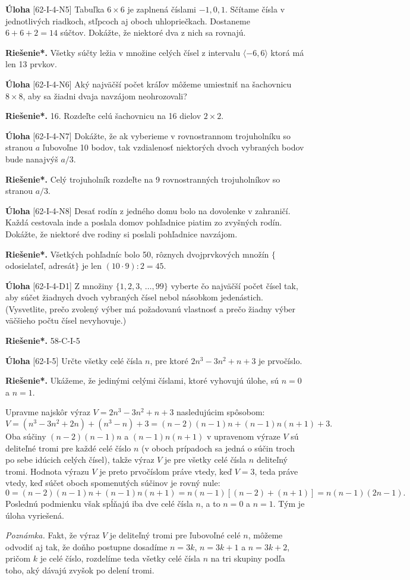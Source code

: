 \documentclass{article}
\newcommand{\rieh}{\textbf{Riešenie*.} }
\newcommand{\problem}[4]{
  \begin{tcolorbox}[breakable,notitle,boxrule=0pt,colback=light-gray,colframe=light-gray]
    \textbf{Úloha}
    [#1] #3
  \end{tcolorbox}
  \noindent#4
}
\begin{document}
\problem{62-I-4-N5}{}{
Tabuľka $6 \times 6$ je zaplnená číslami $-1, 0, 1$. Sčítame čísla v jednotlivých riadkoch, stľpcoch aj oboch uhlopriečkach. Dostaneme $6+6+2 = 14$ súčtov. Dokážte, že niektoré dva z nich sa rovnajú.
}{
\rieh Všetky súčty ležia v množine celých čísel z intervalu $\langle -6, 6 \rangle$ ktorá má len 13 prvkov.
}

\problem{62-I-4-N6}{}{
Aký najväčší počet kráľov môžeme umiestniť na šachovnicu $8\times 8$, aby sa žiadni dvaja navzájom neohrozovali?
}{
\rieh 16. Rozdeľte celú šachovnicu na 16 dielov $2\times 2$.
}


\problem{62-I-4-N7}{}{
Dokážte, že ak vyberieme v rovnostrannom trojuholníku so stranou $a$ ľubovoľne 10 bodov, tak vzdialenosť niektorých dvoch vybraných bodov bude nanajvýš $a/3$.
}{
\rieh Celý trojuholník rozdeľte na 9 rovnostranných trojuholníkov so stranou $a/3$.
}


\problem{62-I-4-N8}{}{
Desať rodín z jedného domu bolo na dovolenke v zahraničí. Každá cestovala inde a poslala domov pohľadnice piatim zo zvyšných rodín. Dokážte, že niektoré dve rodiny si poslali pohľadnice navzájom.
}{
\rieh Všetkých pohľadníc bolo 50, rôznych dvojprvkových množín $\{$odosielateľ, adresát$\}$ je len $(10\cdot9) : 2 = 45$.
}


\problem{62-I-4-D1}{}{
Z množiny $\{1, 2, 3,\,\ldots , 99\}$ vyberte čo najväčší počet čísel tak, aby súčet žiadnych dvoch vybraných čísel nebol násobkom jedenástich. (Vysvetlite, prečo zvolený výber má požadovanú vlastnosť a prečo žiadny výber väčšieho počtu čísel nevyhovuje.)
}{
\rieh 58-C-I-5
}


\problem{62-I-5}{}{
Určte všetky celé čísla $n$, pre ktoré $2n^3 -3n^2 +n+3$ je prvočíslo.
}{
\rieh Ukážeme, že jedinými celými číslami, ktoré vyhovujú úlohe, sú $n = 0$ a $n = 1$.

Upravme najskôr výraz $V = 2n^3 - 3n^2 + n + 3$ nasledujúcim spôsobom:
$$V = (n^3 - 3n^2+ 2n) + (n^3 - n) + 3 = (n - 2)(n - 1)n + (n - 1)n(n + 1) + 3.$$
Oba súčiny $(n-2)(n-1)n$ a $(n-1)n(n+1)$ v upravenom výraze $V$ sú deliteľné tromi pre každé celé číslo $n$ (v oboch prípadoch sa jedná o súčin troch po sebe idúcich celých čísel), takže výraz $V$ je pre všetky celé čísla $n$ deliteľný tromi. Hodnota výrazu $V$ je preto prvočíslom práve vtedy, keď $V = 3$, teda práve vtedy, keď súčet oboch spomenutých súčinov je rovný nule:
$$0 = (n - 2)(n - 1)n + (n - 1)n(n + 1) = n(n - 1)[(n - 2) + (n + 1)] = n(n - 1)(2n - 1).$$
Poslednú podmienku však spĺňajú iba dve celé čísla $n$, a to $n = 0$ a $n = 1$. Tým je úloha vyriešená.

\textit{Poznámka.} Fakt, že výraz $V$ je deliteľný tromi pre ľubovoľné celé $n$, môžeme odvodiť aj tak, že doňho postupne dosadíme $n = 3k$, $n = 3k + 1$ a $n = 3k + 2$, pričom $k$ je celé číslo, rozdelíme teda všetky celé čísla $n$ na tri skupiny podľa toho, aký dávajú zvyšok po delení tromi.
}
\end{document}
